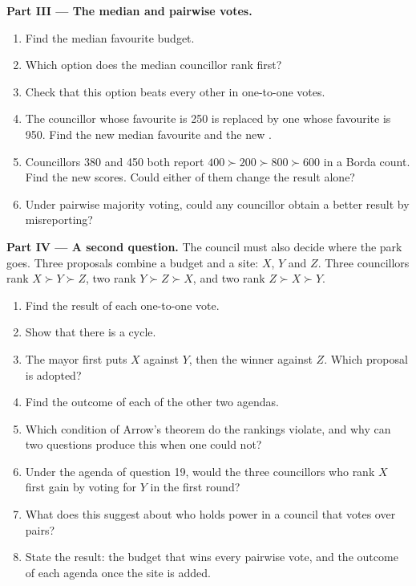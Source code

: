 \begin{problem}
\medskip
\noindent\textbf{Part III --- The median and pairwise votes.}
\begin{enumerate}[resume]
  \item Find the median favourite budget.
  \item Which option does the median councillor rank first?
  \item Check that this option beats every other in one-to-one votes.
  \item The councillor whose favourite is 250 is replaced by one whose favourite is 950. Find the new median
        favourite and the new .
  \item Councillors 380 and 450 both report $400 \succ 200 \succ 800 \succ 600$ in a Borda count. Find the new
        scores. Could either of them change the result alone?
  \item Under pairwise majority voting, could any councillor obtain a better result by misreporting?
\end{enumerate}

\medskip
\noindent\textbf{Part IV --- A second question.} The council must also decide where the park goes.
Three proposals combine a budget and a site: $X$, $Y$ and $Z$. Three councillors rank $X \succ Y \succ Z$, two
rank $Y \succ Z \succ X$, and two rank $Z \succ X \succ Y$.
\begin{enumerate}[resume]
  \item Find the result of each one-to-one vote.
  \item Show that there is a cycle.
  \item The mayor first puts $X$ against $Y$, then the winner against $Z$. Which proposal is adopted?
  \item Find the outcome of each of the other two agendas.
  \item Which condition of Arrow's theorem do the rankings violate, and why can two questions produce
        this when one could not?
  \item Under the agenda of question 19, would the three councillors who rank $X$ first gain by voting
        for $Y$ in the first round?
  \item What does this suggest about who holds power in a council that votes over pairs?
  \item State the result: the budget that wins every pairwise vote, and the outcome of each agenda once the
        site is added.
\end{enumerate}
\end{problem}
